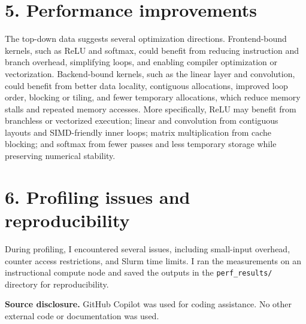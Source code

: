 \documentclass[10pt]{article}
\begin{document}
\section*{5. Performance improvements}
The top-down data suggests several optimization directions. Frontend-bound kernels, such as ReLU and softmax, could benefit from reducing instruction and branch overhead, simplifying loops, and enabling compiler optimization or vectorization. Backend-bound kernels, such as the linear layer and convolution, could benefit from better data locality, contiguous allocations, improved loop order, blocking or tiling, and fewer temporary allocations, which reduce memory stalls and repeated memory accesses. More specifically, ReLU may benefit from branchless or vectorized execution; linear and convolution from contiguous layouts and SIMD-friendly inner loops; matrix multiplication from cache blocking; and softmax from fewer passes and less temporary storage while preserving numerical stability.

\section*{6. Profiling issues and reproducibility}
During profiling, I encountered several issues, including small-input overhead, counter access restrictions, and Slurm time limits. I ran the measurements on an instructional compute node and saved the outputs in the \texttt{perf\_results/} directory for reproducibility.

\textbf{Source disclosure.} GitHub Copilot was used for coding assistance. No other external code or documentation was used.
\end{document}
